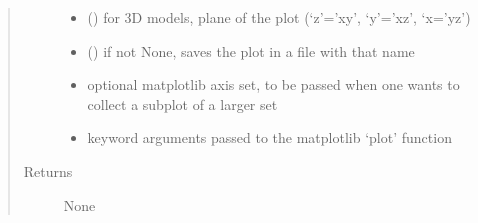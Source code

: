 \documentclass[letterpaper,10pt,english]{sphinxmanual}
\begin{document}
\begin{fulllineitems}
\begin{quote}
\begin{description}
\begin{itemize}
\item {} 
\sphinxAtStartPar
{} () \textendash{} for 3D models, plane of the plot (‘z’=’xy’, ‘y’=’xz’, ‘x=’yz’)

\item {} 
\sphinxAtStartPar
{} () \textendash{} if not None, saves the plot in a file with that name

\item {} 
\sphinxAtStartPar
{} \textendash{} optional matplotlib axis set, to be passed when one wants to collect a subplot of a larger set

\item {} 
\sphinxAtStartPar
{} \textendash{} keyword arguments passed to the matplotlib ‘plot’ function

\end{itemize}

\item[{Returns}] \leavevmode
\sphinxAtStartPar
None

\end{description}\end{quote}

\end{fulllineitems}

\end{document}
